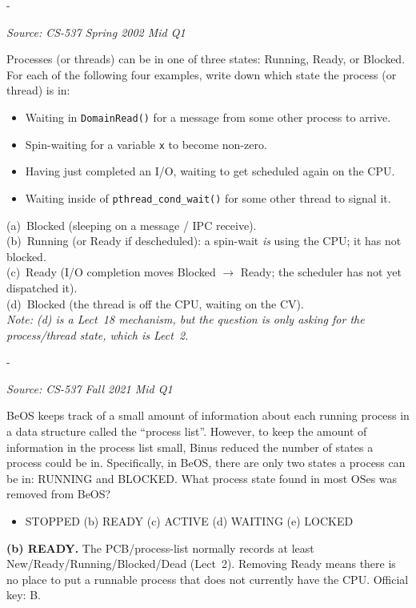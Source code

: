 \documentclass[11pt,a4paper]{article}
\makeatletter
\newcommand{\keepspace}[1]{\par\penalty-100\begingroup
  \setlength{\dimen@}{#1}\dimen@ii\pagegoal\advance\dimen@ii-\pagetotal
  \ifdim\dimen@>\dimen@ii\ifdim\dimen@ii>\z@\vfil\fi\break\fi\endgroup}
\newcounter{qn}[section]
\newenvironment{Qn}[4]{%
  \refstepcounter{qn}\keepspace{7\baselineskip}%
  \begin{tcolorbox}[qboxstyle, title={Q\thesection.\theqn\ \ [#1 \textbar\ #2]\ \ #4}]%
  {\footnotesize\color{g3}\textit{Source: #3}}\par\smallskip%
}{%
  \end{tcolorbox}%
}
\newenvironment{Sol}{%
  \begin{tcolorbox}[sboxstyle, title={Solution}]%
}{%
  \end{tcolorbox}\vspace{0.35em}%
}
\makeatother
\begin{document}
\begin{Qn}{Easy-Medium}{Lect 2}{CS-537 Spring 2002 Mid Q1}{Name the state}
Processes (or threads) can be in one of three states: Running, Ready, or Blocked. For each of the following four examples, write down which state the process (or thread) is in:
\begin{itemize}
  \item[(a)] Waiting in \texttt{DomainRead()} for a message from some other process to arrive.
  \item[(b)] Spin-waiting for a variable \texttt{x} to become non-zero.
  \item[(c)] Having just completed an I/O, waiting to get scheduled again on the CPU.
  \item[(d)] Waiting inside of \texttt{pthread\_cond\_wait()} for some other thread to signal it.
\end{itemize}
\end{Qn}
\begin{Sol}
(a)~Blocked (sleeping on a message / IPC receive).\\
(b)~Running (or Ready if descheduled): a spin-wait \emph{is} using the CPU; it has not blocked.\\
(c)~Ready (I/O completion moves Blocked $\to$ Ready; the scheduler has not yet dispatched it).\\
(d)~Blocked (the thread is off the CPU, waiting on the CV).\\
\textit{Note: (d) is a Lect~18 mechanism, but the question is only asking for the process/thread \emph{state}, which is Lect~2.}
\end{Sol}

\begin{Qn}{Easy-Medium}{Lect 2}{CS-537 Fall 2021 Mid Q1}{BeOS dropped a process state}
BeOS keeps track of a small amount of information about each running process in a data structure called the ``process list''. However, to keep the amount of information in the process list small, Binus reduced the number of states a process could be in. Specifically, in BeOS, there are only two states a process can be in: RUNNING and BLOCKED. What process state found in most OSes was removed from BeOS?
\begin{itemize}
  \item[(a)] STOPPED \quad (b) READY \quad (c) ACTIVE \quad (d) WAITING \quad (e) LOCKED
\end{itemize}
\end{Qn}
\begin{Sol}
\textbf{(b) READY.} The PCB/process-list normally records at least New/Ready/Running/Blocked/Dead (Lect~2). Removing Ready means there is no place to put a runnable process that does not currently have the CPU. Official key: B.
\end{Sol}
\end{document}

